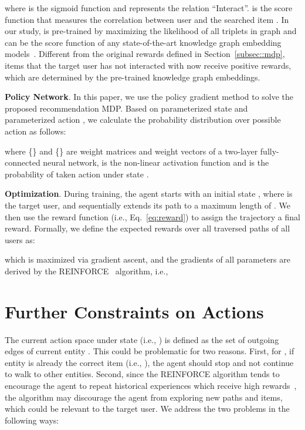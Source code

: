 \documentclass{article}
\newcommand{\xhdr}[1]{{\noindent\bfseries #1}.}
\begin{document}
where  is the sigmoid function and  represents the relation ``Interact''.
 is the score function that measures the correlation between user  and the searched item . In our study,  is pre-trained by maximizing the likelihood of all triplets in graph  and can be the score function of any state-of-the-art knowledge graph embedding models~\cite{dettmers2018convolutional,yang2014embedding}. Different from the original rewards defined in Section~\ref{subsec::mdp}, items that the target user has not interacted with now receive positive rewards, which are determined by the pre-trained knowledge graph embeddings.



\xhdr{Policy Network}
In this paper, we use the policy gradient method to solve the proposed recommendation MDP.
Based on parameterized state  and parameterized action , we calculate the probability distribution over possible action  as follows:

where \{\} and \{\} are weight matrices and weight vectors of a two-layer fully-connected neural network,  is the non-linear activation function and  is the probability of taken action  under state .

\xhdr{Optimization} During training, the agent starts with an initial state , where  is the target user, and sequentially extends its path to a maximum length of . We then use the reward function (i.e., Eq.~\ref{eq:reward}) to assign the trajectory  a final reward. Formally, we define the expected rewards over all traversed paths of all users as:

which is maximized via gradient ascent, and the gradients of all parameters  are derived by the REINFORCE~\cite{williams1992simple} algorithm, i.e.,

 \section{Further Constraints on Actions}
The current action space under state  (i.e., ) is defined as the set of outgoing edges of current entity . This could be problematic for two reasons. First, for , if entity  is already the correct item (i.e., ), the agent should stop and not continue to walk to other entities. Second, since the REINFORCE algorithm tends to encourage the agent to repeat historical experiences which receive high rewards~\cite{Guu_2017}, the algorithm may discourage the agent from exploring new paths and items, which could be relevant to the target user. We address the two problems in the following ways:
\end{document}
